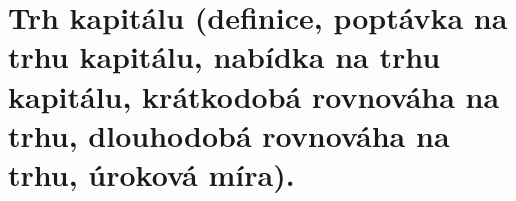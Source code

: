 \clearpage
\section{Trh kapitálu (definice, poptávka na trhu kapitálu, nabídka na trhu kapitálu, krátkodobá
rovnováha na trhu, dlouhodobá rovnováha na trhu, úroková míra).}
